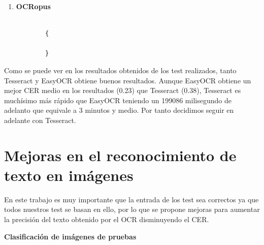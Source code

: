 \begin{enumerate}
	\item \textbf{OCRopus}
	
		\begin{verbatim}
		
		{

		}
	\end{verbatim}
\end{enumerate}


Como se puede ver en los resultados obtenidos de los test realizados, tanto Tesseract y EasyOCR obtiene buenos resultados. Aunque EasyOCR obtiene un mejor CER medio en los resultados (0.23) que Tesseract (0.38), Tesseract es muchísimo más rápido que EasyOCR teniendo un 199086 milisegundo de adelanto que equivale a 3 minutos y medio. Por tanto decidimos seguir en adelante con Tesseract.



\section{Mejoras en el reconocimiento de texto en imágenes}
En este trabajo es muy importante que la entrada de los test sea correctos ya que todos nuestros test se basan en ello, por lo que se propone mejoras para aumentar la precisión del texto obtenido por el OCR disminuyendo el CER.

\textbf{Clasificación de imágenes de pruebas}

